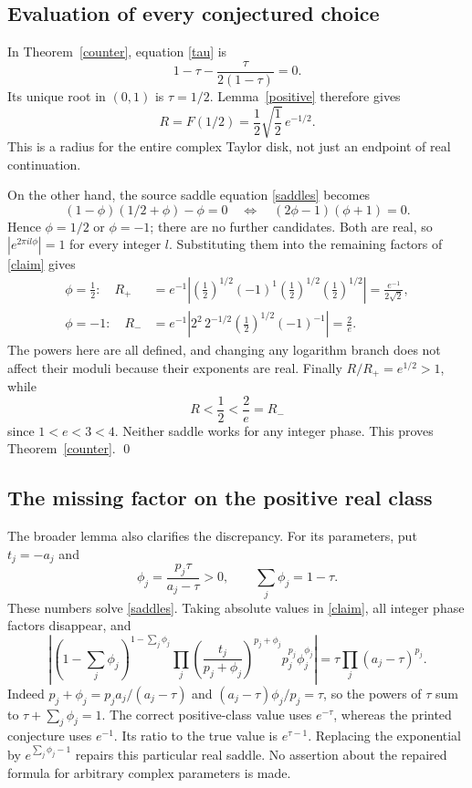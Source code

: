 \documentclass[11pt]{article}
\begin{document}
\subsection*{Evaluation of every conjectured choice}
In Theorem~\ref{counter}, equation \eqref{tau} is
\[
 1-\tau-\frac{\tau}{2(1-\tau)}=0.
\]
Its unique root in \((0,1)\) is \(\tau=1/2\).
Lemma~\ref{positive} therefore gives
\[
 R=F(1/2)=\frac12\sqrt{\frac12}\,e^{-1/2}.
\]
This is a radius for the entire complex Taylor disk, not just an
endpoint of real continuation.

On the other hand, the source saddle equation \eqref{saddles} becomes
\[
 (1-\phi)(1/2+\phi)-\phi=0
 \quad\Longleftrightarrow\quad
 (2\phi-1)(\phi+1)=0.
\]
Hence \(\phi=1/2\) or \(\phi=-1\); there are no further candidates.
Both are real, so \(|e^{2\pi i l\phi}|=1\) for every integer \(l\).
Substituting them into the remaining factors of \eqref{claim} gives
\begin{align*}
 \phi=\tfrac12:\quad
 R_+&=e^{-1}
 \left|(\tfrac12)^{1/2}(-1)^1
             (\tfrac12)^{1/2}(\tfrac12)^{1/2}\right|
       =\frac{e^{-1}}{2\sqrt2},\\
 \phi=-1:\quad
 R_-&=e^{-1}
 \left|2^2\,2^{-1/2}(\tfrac12)^{1/2}(-1)^{-1}\right|
       =\frac2e.
\end{align*}
The powers here are all defined, and changing any logarithm branch
does not affect their moduli because their exponents are real.
Finally \(R/R_+=e^{1/2}>1\), while
\[
 R<\frac12<\frac2e=R_-
\]
since \(1<e<3<4\). Neither saddle works for any integer phase.
This proves Theorem~\ref{counter}. \qed

\subsection*{The missing factor on the positive real class}
The broader lemma also clarifies the discrepancy. For its parameters,
put \(t_j=-a_j\) and
\[
 \phi_j=\frac{p_j\tau}{a_j-\tau}>0,\qquad
 \sum_j\phi_j=1-\tau.
\]
These numbers solve \eqref{saddles}. Taking absolute values in
\eqref{claim}, all integer phase factors disappear, and
\[
 \left|
 (1-\textstyle\sum_j\phi_j)^{1-\sum_j\phi_j}
 \prod_j
 \left(\frac{t_j}{p_j+\phi_j}\right)^{p_j+\phi_j}
 p_j^{p_j}\phi_j^{\phi_j}
 \right|
 =\tau\prod_j(a_j-\tau)^{p_j}.
\]
Indeed \(p_j+\phi_j=p_ja_j/(a_j-\tau)\) and
\((a_j-\tau)\phi_j/p_j=\tau\), so the powers of \(\tau\)
sum to \(\tau+\sum_j\phi_j=1\).
The correct positive-class value uses \(e^{-\tau}\), whereas the
printed conjecture uses \(e^{-1}\). Its ratio to the true value
is \(e^{\tau-1}\). Replacing the exponential by
\(e^{\sum_j\phi_j-1}\) repairs this particular real saddle.
No assertion about the repaired formula for arbitrary complex
parameters is made.
\end{document}
